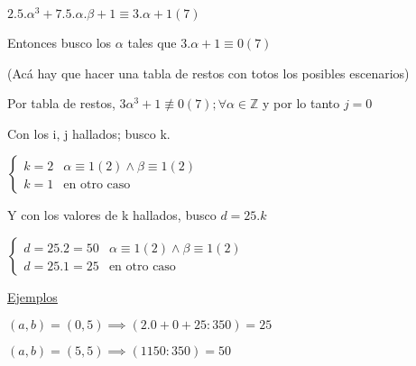 $ 2.5.\alpha^3 + 7.5.\alpha.\beta + 1 \equiv 3.\alpha + 1 (7) $

Entonces busco los $ \alpha $ tales que $ 3.\alpha + 1 \equiv 0 (7) $

(Acá hay que hacer una tabla de restos con totos los posibles escenarios)

Por tabla de restos, $ 3\alpha^3+1 \not \equiv 0(7); \forall \alpha \in \mathbb{Z} $ y por lo tanto $ j = 0 $

Con los i, j hallados; busco k.

$ \begin{cases}
    k = 2 & \alpha \equiv 1 (2) \wedge \beta \equiv 1(2) \\
    k = 1 & \text{en otro caso}
\end{cases} $

Y con los valores de k hallados, busco $ d = 25.k $

$ \begin{cases}
    d = 25.2 = 50 & \alpha \equiv 1 (2) \wedge \beta \equiv 1(2) \\
    d = 25.1 = 25 & \text{en otro caso}
\end{cases} $

\underline{Ejemplos}

$ (a,b) = (0,5) \implies (2.0+0+25:350) = 25 $

$ (a,b) = (5,5) \implies (1150:350) = 50 $



